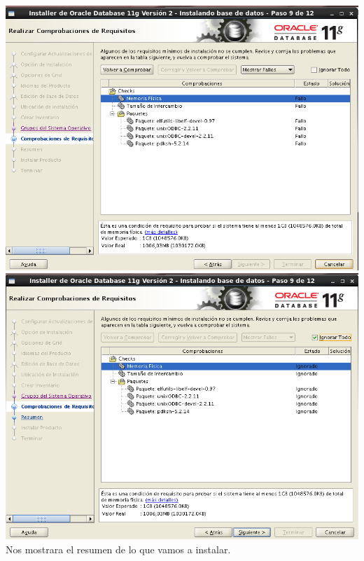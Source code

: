 \documentclass[a4paper,openright,12pt]{book}
\begin{document}
\begin{center}
\includegraphics[width=15cm]{./oracle linux/21.png}\includegraphics[width=15cm]{./oracle linux/22.png}
Nos mostrara el resumen de lo que vamos a instalar.\\

\end{center}
\end{document}
